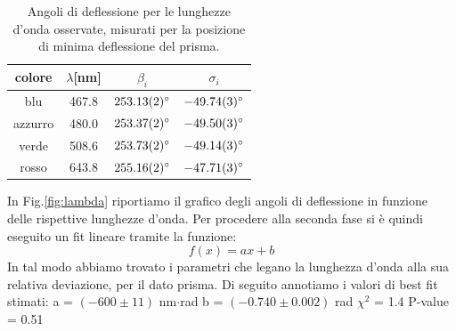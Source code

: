 \documentclass[10pt,a4paper]{article}
\begin{document}
    \begin{table}[]
        \centering
        \begin{tabular}{cccc}
        colore&$ \lambda $[nm]&$\beta_i$&$\sigma_i $\\\hline\hline
        blu&467.8&$\ang{253.13\pm0.02}$&$\ang{-49.74\pm0.03}$\\
        azzurro&480.0&$\ang{253.37\pm0.02}$&$\ang{-49.5\pm0.03}$\\
        verde&508.6&$\ang{253.73\pm0.02}$&$\ang{-49.14\pm0.03}$\\
        rosso&643.8&$\ang{255.16\pm0.02}$&$\ang{-47.71\pm0.03}$\\\hline
        \end{tabular}
        \caption{Angoli di deflessione per le lunghezze d'onda osservate, misurati per la posizione di minima deflessione del prisma.}
        \label{tab:colori}
    \end{table}
    \newline
    In Fig.\ref{fig:lambda} riportiamo il grafico degli angoli di deflessione in funzione delle rispettive lunghezze d'onda.\newline
    Per procedere alla seconda fase si è quindi eseguito un fit lineare tramite la funzione:
    \begin{equation*}
    f(x) = ax+b
    \end{equation*}
    In tal modo abbiamo trovato i parametri che legano la lunghezza d'onda alla sua relativa deviazione, per il dato prisma.\newline
    Di seguito annotiamo i valori di best fit stimati:\newline\newline
    a = $(-600 \pm 11)$ nm$\cdot$rad\newline
    b = $(-0.740 \pm 0.002)$ rad\newline
    $\chi^2$ = 1.4\newline
    P-value = 0.51\newline
    
\end{document}

